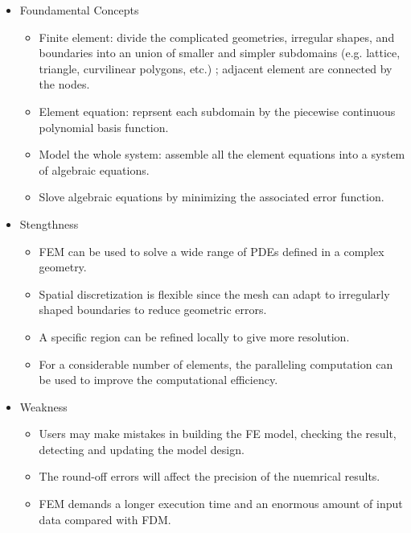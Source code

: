       
      \begin{itemize}
        \item Foundamental Concepts
          \begin{itemize}
            \item Finite element: divide the complicated geometries, irregular shapes, and boundaries into an union of smaller and simpler subdomains (e.g. lattice, triangle, curvilinear polygons, etc.) \cite{logan2011first}; adjacent element are connected by the nodes.
            \item Element equation: reprsent each subdomain by the piecewise continuous polynomial basis function.
            \item Model the whole system: assemble all the element equations into a system of algebraic equations.
            \item Slove algebraic equations by minimizing the associated error function.
          \end{itemize}
          
          
        \item Stengthness
          
          \begin{itemize}
            \item FEM can be used to solve a wide range of PDEs defined in a complex geometry.
            \item Spatial discretization is flexible since the mesh can adapt to irregularly shaped boundaries to reduce geometric errors.
            \item A specific region can be refined locally to give more resolution.
            \item For a considerable number of elements, the paralleling computation can be used to improve the computational efficiency.
          \end{itemize}
          
        \item Weakness
          
          \begin{itemize}
            \item Users may make mistakes in building the FE model, checking the result, detecting and updating the model design.
            \item The round-off errors will affect the precision of the nuemrical results.
            \item FEM demands a longer execution time and an enormous amount of input data compared with FDM.
          \end{itemize}
          
      \end{itemize}


